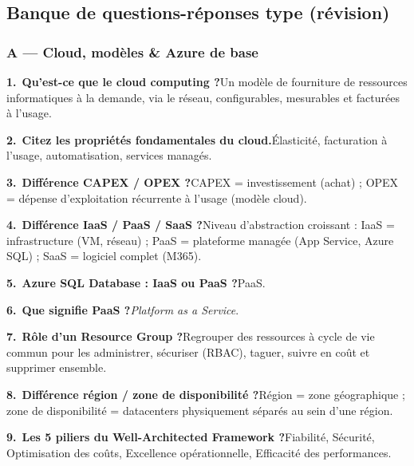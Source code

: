 \documentclass[11pt,a4paper]{article}
\newcommand{\qa}[3]{\par\addvspace{1.5pt}%
  \textbf{\color{azuredark}#1.}~\textbf{#2}\quad#3\par}
\begin{document}
\subsection{Banque de questions-réponses type (révision)}

\subsubsection{A — Cloud, modèles \& Azure de base}
\qa{1}{Qu'est-ce que le cloud computing ?}{Un modèle de fourniture de ressources informatiques à la demande, via le réseau, configurables, mesurables et facturées à l'usage.}
\qa{2}{Citez les propriétés fondamentales du cloud.}{Élasticité, facturation à l'usage, automatisation, services managés.}
\qa{3}{Différence CAPEX / OPEX ?}{CAPEX = investissement (achat) ; OPEX = dépense d'exploitation récurrente à l'usage (modèle cloud).}
\qa{4}{Différence IaaS / PaaS / SaaS ?}{Niveau d'abstraction croissant : IaaS = infrastructure (VM, réseau) ; PaaS = plateforme managée (App Service, Azure SQL) ; SaaS = logiciel complet (M365).}
\qa{5}{Azure SQL Database : IaaS ou PaaS ?}{PaaS.}
\qa{6}{Que signifie PaaS ?}{\emph{Platform as a Service}.}
\qa{7}{Rôle d'un Resource Group ?}{Regrouper des ressources à cycle de vie commun pour les administrer, sécuriser (RBAC), taguer, suivre en coût et supprimer ensemble.}
\qa{8}{Différence région / zone de disponibilité ?}{Région = zone géographique ; zone de disponibilité = datacenters physiquement séparés au sein d'une région.}
\qa{9}{Les 5 piliers du Well-Architected Framework ?}{Fiabilité, Sécurité, Optimisation des coûts, Excellence opérationnelle, Efficacité des performances.}
\end{document}
